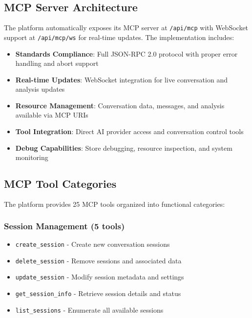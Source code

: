 \documentclass[11pt,letterpaper]{article}
\begin{document}
\subsection{MCP Server Architecture}

The platform automatically exposes its MCP server at \texttt{/api/mcp} with WebSocket support at \texttt{/api/mcp/ws} for real-time updates. The implementation includes:

\begin{itemize}
    \item \textbf{Standards Compliance}: Full JSON-RPC 2.0 protocol with proper error handling and abort support
    \item \textbf{Real-time Updates}: WebSocket integration for live conversation and analysis updates
    \item \textbf{Resource Management}: Conversation data, messages, and analysis available via MCP URIs
    \item \textbf{Tool Integration}: Direct AI provider access and conversation control tools
    \item \textbf{Debug Capabilities}: Store debugging, resource inspection, and system monitoring
\end{itemize}

\subsection{MCP Tool Categories}

The platform provides 25 MCP tools organized into functional categories:

\subsubsection{Session Management (5 tools)}
\begin{itemize}
    \item \texttt{create\_session} - Create new conversation sessions
    \item \texttt{delete\_session} - Remove sessions and associated data
    \item \texttt{update\_session} - Modify session metadata and settings
    \item \texttt{get\_session\_info} - Retrieve session details and status
    \item \texttt{list\_sessions} - Enumerate all available sessions
\end{itemize}
\end{document}
